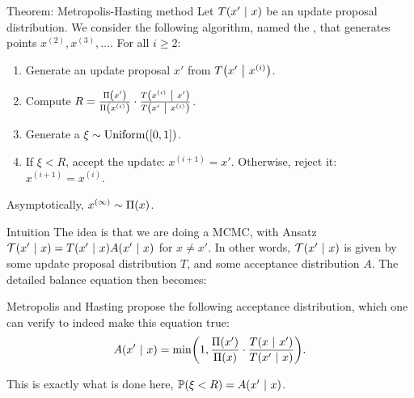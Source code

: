 \documentclass[a4paper]{article}
\begin{document}
\begin{parag}{Theorem: Metropolis-Hasting method}
    Let $T\left(x' \suchthat x\right)$ be an update proposal distribution. We consider the following algorithm, named the , that generates points $x^{\left(2\right)}, x^{\left(3\right)}, \ldots$. For all $i \geq 2$:
    \begin{enumerate}
        \item Generate an update proposal $x'$ from $T\left(x' \suchthat x^{\left(i\right)}\right)$.
        \item Compute $R = \frac{\Pi\left(x'\right)}{\Pi\left(x^{\left(i\right)}\right)}\cdot \frac{T\left(x^{\left(i\right)} \suchthat x'\right)}{T\left(x' \suchthat x^{\left(i\right)}\right)}$.
        \item Generate a $\xi \followsdistr \text{Uniform}\left(\left[0, 1\right]\right)$.
        \item If $\xi < R$, accept the update: $x^{\left(i+1\right)} = x'$. Otherwise, reject it: $x^{\left(i+1\right)} = x^{\left(i\right)}$.
    \end{enumerate}

    Asymptotically, $x^{\left(\infty\right)} \followsdistr \Pi\left(x\right)$.

    \begin{subparag}{Intuition}
        The idea is that we are doing a MCMC, with Ansatz $\mathcal{T}\left(x' \suchthat x\right) = T\left(x' \suchthat x\right) A\left(x' \suchthat x\right)$ for $x \neq x'$. In other words, $\mathcal{T}\left(x' \suchthat x\right)$ is given by some update proposal distribution $T$, and some acceptance distribution $A$. The detailed balance equation then becomes:

        Metropolis and Hasting propose the following acceptance distribution, which one can verify to indeed make this equation true:
        \[A\left(x' \suchthat x\right) = \min\left(1, \frac{\Pi\left(x'\right)}{\Pi\left(x\right)}\cdot \frac{T\left(x \suchthat x'\right)}{T\left(x' \suchthat x\right)}\right).\]

        This is exactly what is done here, $\prob\left(\xi < R\right) = A\left(x' \suchthat x\right)$. 


\end{subparag}
\end{parag}
\end{document}
